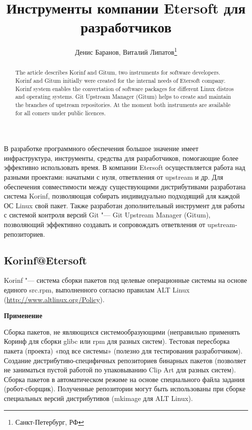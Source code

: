 \documentclass[10pt, a5paper]{article}
\begin{document}
\title{Инструменты компании Etersoft для разработчиков}%

\author{Денис Баранов, Виталий Липатов\footnote{Санкт-Петербург, РФ}}
\maketitle

\begin{abstract}
The article describes Korinf and Gitum, two instruments for software developers. Korinf and Gitum initially were created for the internal needs of Etersoft company. Korinf system enables the convertation of software packages for different Linux distros and operating systems. Git Upstream Manager (Gitum) helps to create and maintain the branches of upstream repositories. At the moment both instruments are available for all comers under public licences.
\end{abstract}

В разработке программного обеспечения большое значение имеет инфраструктура, инструменты, средства для разработчиков, помогающие более эффективно использовать время. В компании \linebreak Etersoft осуществляется работа над разными проектами: начатыми с нуля, ответвления от upstream и др. Для обеспечения совместимости между существующими дистрибутивами разработана система Korinf, позволяющая собирать индивидуально подходящий для каждой ОС Linux свой пакет. Также разработан дополнительный инструмент для работы с системой контроля версий Git "--- Git Upstream Manager (Gitum), позволяющий эффективно создавать и сопровождать ответвления от upstream-репозиториев.

\subsection*{Korinf@Etersoft}

Korinf "--- система сборки пакетов под целевые операционные системы на основе единого src.rpm, выполненного согласно правилам ALT Linux (\url{http://www.altlinux.org/Policy}).

\textbf{Применение}

	Сборка пакетов, не являющихся системообразующими (неправильно применять Коринф для сборки glibc или rpm для разных систем). 
	Тестовая пересборка пакета (проекта) «под все системы» (полезно для тестирования разработчиком). 
	Создание дистрибутиво-специфичных репозиториев бинарных пакетов (позволяет не заниматься пустой работой по упаковыванию Clip Art для разных систем). 
	Сборка пакетов в автоматическом режиме на основе специального файла задания (робот-сборщик). 
	Полученные репозитории могут быть использованы при сборке специальных версий дистрибутивов (mkimage для ALT Linux).
\end{document}
